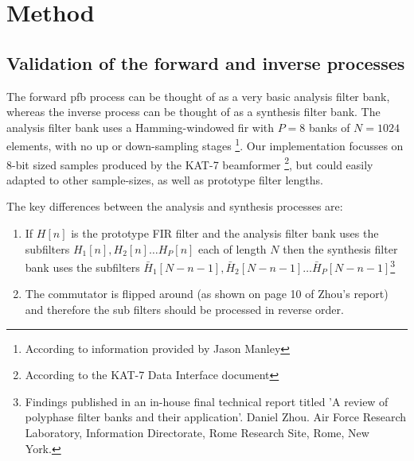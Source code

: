 \documentclass[a4paper,10pt]{article}
\begin{document}
\section{Method}
\subsection{Validation of the forward and inverse processes}
The forward \gls{pfb} process can be thought of as a very basic analysis filter bank, whereas the inverse process can be thought of as a synthesis filter bank. The 
analysis filter bank uses a Hamming-windowed \gls{fir} with $P=8$ banks of $N=1024$ elements, with no up or down-sampling stages \footnote{According to information provided by Jason Manley}.
Our implementation focusses on 8-bit sized samples produced by the KAT-7 beamformer \footnote{According to the KAT-7 Data Interface document}, but could easily adapted to other sample-sizes,
as well as prototype filter lengths.

The key differences between the analysis and synthesis processes are:
\begin{enumerate}
 \item If $H[n]$ is the prototype FIR filter and the analysis filter bank uses the subfilters $H_1[n], H_2[n] \dots H_P[n]$ each of length $N$ then the synthesis filter bank
 uses the subfilters $\bar H_1[N-n-1], \bar H_2[N-n-1] \dots \bar H_P[N-n-1]$\footnote{Findings published in an in-house final technical report titled 'A review of polyphase filter 
 banks and their application'. Daniel Zhou. Air Force Research Laboratory, Information Directorate, Rome Research Site, Rome, New York.}
 \item The commutator is flipped around (as shown on page 10 of Zhou's report) and therefore the sub filters should be processed in reverse order.
\end{enumerate}
\end{document}
